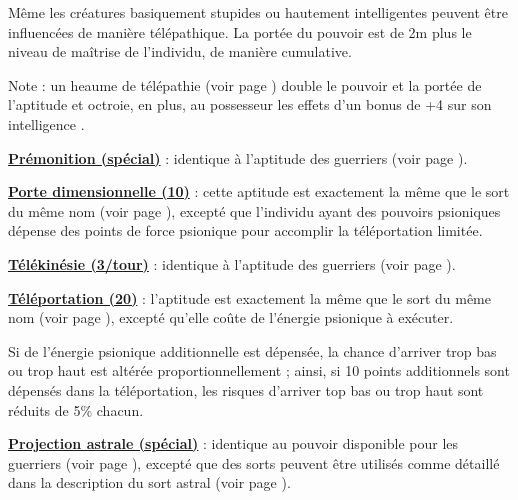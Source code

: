 \bigskip

Même les créatures basiquement stupides ou hautement intelligentes peuvent être influencées de manière télépathique. La portée du pouvoir est de 2m plus le niveau de maîtrise de l'individu, de manière cumulative.

\bigskip

Note : un heaume de télépathie (voir page \pageref{objet-heaume-telepathie}) double le pouvoir et la portée de l'aptitude et octroie, en plus, au possesseur les effets d'un bonus de +4 sur son intelligence .

\bigskip

\label{magicien-premonition}\textbf{\uline{Prémonition (spécial)}} : identique à l'aptitude des guerriers (voir page \pageref{guerrier-premonition}).

\bigskip

\label{magicien-porte-dimensionnelle}\textbf{\uline{Porte dimensionnelle (10)}} : cette aptitude est exactement la même que le sort du même nom (voir page \pageref{sort-porte-dimensionnelle}), excepté que l'individu ayant des pouvoirs psioniques dépense des points de force psionique pour accomplir la téléportation limitée.

\bigskip

\textbf{\uline{Télékinésie (3/tour)}} : identique à l'aptitude des guerriers (voir page \pageref{guerrier-telekinesie}).

\bigskip

\label{magicien-teleportation}\textbf{\uline{Téléportation (20)}} : l'aptitude est exactement la même que le sort du même nom (voir page \pageref{sort-teleporter}), excepté qu'elle coûte de l'énergie psionique à exécuter.

\bigskip

Si de l'énergie psionique additionnelle est dépensée, la chance d'arriver trop bas ou trop haut est altérée proportionnellement ; ainsi, si 10 points additionnels sont dépensés dans la téléportation, les risques d'arriver top bas ou trop haut sont réduits de 5\% chacun.

\bigskip

\label{magicien-projection-astrale}\textbf{\uline{Projection astrale (spécial)}} : identique au pouvoir disponible pour les guerriers (voir page \pageref{guerrier-projection-astrale}), excepté que des sorts peuvent être utilisés comme détaillé dans la description du sort astral (voir page \pageref{sort-astral}).

